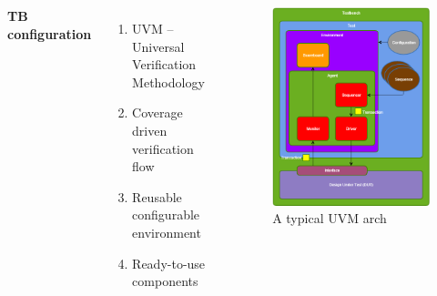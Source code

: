 \documentclass{beamer}
\begin{document}
\begin{frame}
  \begin{columns}[c] %

    \textbf{TB configuration}
    \begin{enumerate}
    \item UVM -- Universal Verification Methodology
    \item Coverage driven verification flow
    \item Reusable configurable environment
    \item Ready-to-use components
    \end{enumerate}

    \begin{figure}
      \centering
      \includegraphics[width=0.9\linewidth]{uvm_arch}
      \caption{A typical UVM arch}
    \end{figure}

  \end{columns}
\end{frame}
\end{document}
